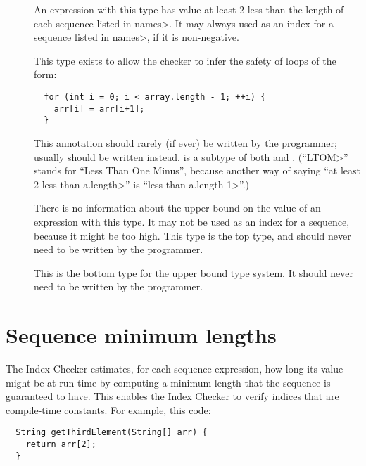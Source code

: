 \begin{description}
\item[]
  An expression with this type
  has value at least 2 less than the length of each sequence listed in \<names>.
  It may always used as an index for a sequence listed in \<names>, if it is
  non-negative.

  This type exists to allow the checker to infer the safety of loops of
  the form:
\begin{Verbatim}
  for (int i = 0; i < array.length - 1; ++i) {
    arr[i] = arr[i+1];
  }
\end{Verbatim}
  This annotation should rarely (if ever) be written by the programmer; usually
  should be written instead.
   is a subtype of both
   and .
  (``\<LTOM>'' stands for ``Less Than One Minus'', because another way of
  saying ``at least 2 less than \<a.length>'' is ``less than \<a.length-1>''.)

\item[]
  There is no information about the upper bound on the value of an expression with this type.
  It may not be used as an index for a sequence, because it might be too high.
  This type is the top type, and should never need to be written by the
  programmer.

\item[]
  This is the bottom type for the upper bound type system. It should
  never need to be written by the programmer.

\end{description}


\section{Sequence minimum lengths\label{index-minlen}}

The Index Checker estimates, for each sequence expression, how long its value
might be at run time by computing a minimum length that
the sequence is guaranteed to have.  This enables the Index Checker to
verify indices that are compile-time constants.  For example, this code:

\begin{Verbatim}
  String getThirdElement(String[] arr) {
    return arr[2];
  }
\end{Verbatim}

